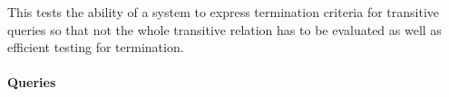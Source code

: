 
This tests the ability of a system to express termination criteria for transitive queries so that not the whole transitive relation has to be evaluated as well as efficient testing for termination.


\paragraph{Queries}
{\raggedright

}